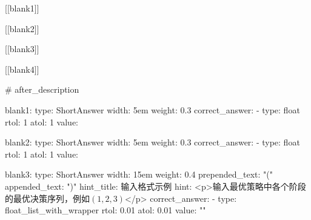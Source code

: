 [[blank1]]

[[blank2]]

[[blank3]]

[[blank4]] 

 \#{ after_description }

blank1:
    type: ShortAnswer
    width: 5em
    weight: 0.3
    correct_answer:
    - type: float
      rtol: 1
      atol: 1
      value: 

blank2:
    type: ShortAnswer
    width: 5em
    weight: 0.3
    correct_answer:
    - type: float
      rtol: 1
      atol: 1
      value: 

blank3:
    type: ShortAnswer
    width: 15em
    weight: 0.4
    prepended_text: "("
    appended_text: ")"
    hint_title: 输入格式示例
    hint: <p>输入最优策略中各个阶段的最优决策序列，例如$(1, 2, 3)$</p>
    correct_answer:
    - type: float_list_with_wrapper
      rtol: 0.01
      atol: 0.01
      value: ""

